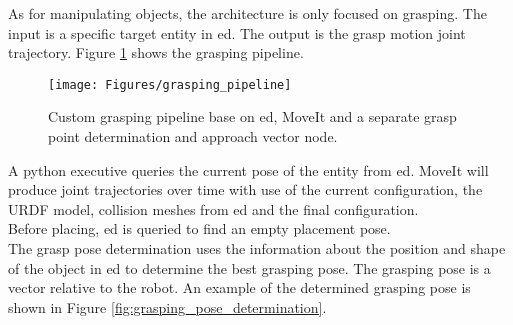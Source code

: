 As for manipulating objects, the architecture is only focused on grasping. 
The input is a specific target entity in \acrshort{ed}. 
The output is the grasp motion joint trajectory. 
Figure \ref{fig:grasping_pipeline} shows the grasping pipeline.
\begin{figure}[h]
    \centering
	\texttt{[image: Figures/grasping\_pipeline]}
	\caption{Custom grasping pipeline base on \acrshort{ed}, MoveIt and a separate grasp point determination and approach vector node.}
	\label{fig:grasping_pipeline}
\end{figure}
A python executive queries the current pose of the entity from \acrshort{ed}.
MoveIt will produce joint trajectories over time with use of the current configuration, the URDF model, collision meshes from \acrshort{ed} and the final configuration. 
\\
Before placing, \acrshort{ed} is queried to find an empty placement pose.
\\
The grasp pose determination uses the information about the position and shape of the object in \acrshort{ed} to determine the best grasping pose. 
The grasping pose is a vector relative to the robot. An example of the determined grasping pose is shown in Figure \ref{fig:grasping_pose_determination}.
